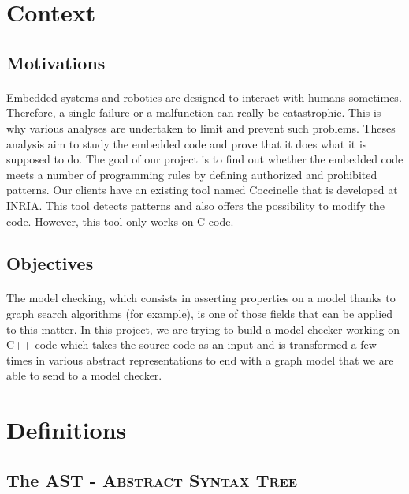 \documentclass{report}
\begin{document}
\section{Context}

\subsection{Motivations}

\paragraph{}
\hspace{4mm}\textnormal{Embedded systems and robotics are designed to interact with 
humans sometimes. Therefore, a single failure or a malfunction 
can really be catastrophic.  This is why various analyses are 
undertaken to limit and prevent such problems. Theses analysis aim
 to study the embedded code and prove that it does what it is 
supposed to do. The goal of our project is to find out whether the
 embedded code meets a number of programming rules by 
defining authorized and prohibited patterns. 
Our clients have an existing tool named Coccinelle that is 
developed at INRIA. This tool detects patterns and also offers
 the possibility to modify the code. However, this tool only works
 on C code.}

\subsection{Objectives}

\paragraph{}
\hspace{4mm}\textnormal{The model checking, which consists in asserting properties 
on a model thanks to graph search algorithms (for example),
 is one of those fields that can be applied to this matter.
 In this project, we are trying to build a model checker working
 on C++ code which takes the source code as an input and is 
transformed a few times in various abstract representations to end 
with a graph model that we are able to send to a model checker.}

\section{Definitions}

\subsection{The AST - \textsc{Abstract Syntax Tree}}
\end{document}
